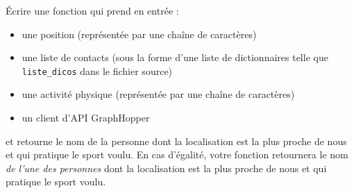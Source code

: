 \documentclass[11pt,a4paper]{article}
\begin{document}
  Écrire une fonction qui prend en entrée :
    \begin{itemize}
        \item une position (représentée par une chaîne de caractères)
        \item une liste de contacts (sous la forme d'une liste de dictionnaires telle que \verb+liste_dicos+ dans le fichier source)
        \item une activité physique (représentée par une chaîne de caractères)
        \item un client d'API GraphHopper
    \end{itemize}
    et retourne le nom de la personne dont la localisation est la plus proche de nous et qui pratique le sport voulu. En cas d'égalité, votre fonction retournera le nom \emph{ de l'une des personnes} dont la localisation est la plus proche de nous et qui pratique le sport voulu.
\end{document}
